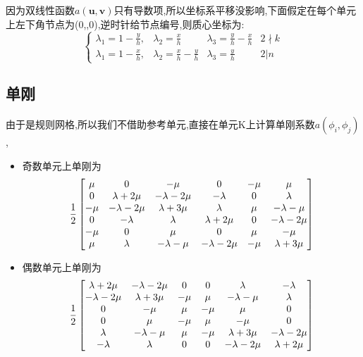 \documentclass[UTF8]{ctexart}
\begin{document}
因为双线性函数$a(\mathbf{u},\mathbf{v})$只有导数项,所以坐标系平移没影响,下面假定在每个单元上左下角节点为(0,,0),逆时针给节点编号,则质心坐标为:
\begin{equation}
  \left\{
  \begin{array}{cccc}
    \lambda_1 = 1-\frac{y}{h}, &\lambda_2=\frac{x}{h}  &\lambda_3 = \frac{y}{h}-\frac{x}{h}  & 2\nmid k  \\
   \lambda_1 = 1-\frac{x}{h}, &\lambda_2=\frac{x}{h}-\frac{y}{h}  &\lambda_3 = \frac{y}{h}  & 2 | n
  \end{array}
  \right.
\end{equation}
\subsection{单刚}
由于是规则网格,所以我们不借助参考单元,直接在单元K上计算单刚系数$a(\phi_i,\phi_j)$,
\begin{itemize}
  \item 奇数单元上单刚为
  \begin{equation}\notag
    \frac{1}{2} \left[
    \begin{matrix}
      \mu & 0 & -\mu & 0& -\mu &\mu \\
      0 & \lambda + 2\mu & -\lambda-2\mu & -\lambda & 0 & \lambda \\
      -\mu & -\lambda-2\mu & \lambda+3\mu & \lambda & \mu & -\lambda-\mu \\
      0 & -\lambda & \lambda & \lambda + 2\mu & 0 & -\lambda-2\mu \\
      -\mu & 0 & \mu & 0 & \mu & -\mu\\
      \mu & \lambda & -\lambda-\mu & -\lambda-2\mu & -\mu &\lambda+3\mu
    \end{matrix}
    \right]
  \end{equation}
  \item 偶数单元上单刚为
    \begin{equation}\notag
    \frac{1}{2} \left[
    \begin{matrix}
      \lambda+2\mu & -\lambda-2\mu &0 & 0& \lambda &-\lambda \\
      -\lambda-2\mu & \lambda + 3\mu & -\mu & \mu & -\lambda-\mu & \lambda \\
      0 & -\mu & \mu & -\mu& \mu &0 \\
      0 & \mu & -\mu  & \mu & -\mu  & 0 \\
      \lambda & -\lambda-\mu & \mu & -\mu & \lambda + 3\mu &-\lambda-2\mu\\
      -\lambda & \lambda & 0 & 0 & -\lambda-2\mu &\lambda+2\mu
    \end{matrix}
    \right]
  \end{equation}
\end{itemize}
\end{document}
